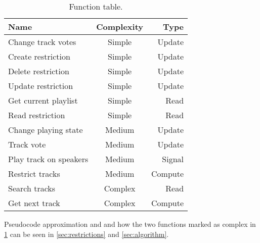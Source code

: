 \begin{table}[hbtp]
\centering
\begin{tabular}{lcr}
\toprule
\textbf{Name}									 & \textbf{Complexity}	& \textbf{Type} \\
\midrule
Change track votes             & Simple								& Update  \\
Create restriction             & Simple								& Update  \\
Delete restriction             & Simple								& Update  \\
Update restriction             & Simple								& Update  \\
Get current playlist           & Simple								& Read    \\
Read restriction               & Simple								& Read    \\
Change playing state           & Medium								& Update  \\
Track vote                     & Medium								& Update  \\
Play track on speakers         & Medium								& Signal  \\
Restrict tracks                & Medium								& Compute \\
Search tracks                  & Complex							& Read    \\
Get next track                 & Complex							& Compute \\
\bottomrule
\end{tabular}
\caption{Function table.}
\label{table:functionlist}
\end{table}

Pseudocode approximation and and how the two functions marked as complex in \cref{table:functionlist} can be seen in \cref{sec:restrictions} and \cref{sec:algorithm}.